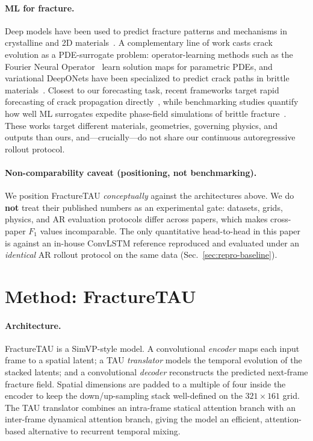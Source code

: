 \documentclass[11pt]{article}
\begin{document}
\paragraph{ML for fracture.}
Deep models have been used to predict fracture patterns and mechanisms in
crystalline and 2D materials~\citep{hsu2020fracture,lew2021fracture}. A
complementary line of work casts crack evolution as a PDE-surrogate problem:
operator-learning methods such as the Fourier Neural Operator~\citep{li2021fno}
learn solution maps for parametric PDEs, and variational DeepONets have been
specialized to predict crack paths in brittle materials~\citep{goswami2022deeponet}.
Closest to our forecasting task, recent frameworks target rapid forecasting of
crack propagation directly~\citep{yan2024crackforecast}, while benchmarking studies
quantify how well ML surrogates expedite phase-field simulations of brittle
fracture~\citep{hamdi2025phasefield}. These works target different materials,
geometries, governing physics, and outputs than ours, and---crucially---do not
share our continuous autoregressive rollout protocol.

\paragraph{Non-comparability caveat (positioning, not benchmarking).}
We position FractureTAU \emph{conceptually} against the architectures above. We do
\textbf{not} treat their published numbers as an experimental gate: datasets,
grids, physics, and AR evaluation protocols differ across papers, which makes
cross-paper $F_1$ values incomparable. The only quantitative head-to-head in this
paper is against an in-house ConvLSTM reference reproduced and evaluated under an
\emph{identical} AR rollout protocol on the same data
(Sec.~\ref{sec:repro-baseline}).

\section{Method: FractureTAU}
\label{sec:method}

\paragraph{Architecture.}
FractureTAU is a SimVP-style model. A convolutional \emph{encoder} maps each input
frame to a spatial latent; a TAU \emph{translator} models the temporal evolution
of the stacked latents; and a convolutional \emph{decoder} reconstructs the
predicted next-frame fracture field. Spatial dimensions are padded to a multiple
of four inside the encoder to keep the down/up-sampling stack well-defined on the
$321\times161$ grid. The TAU translator combines an intra-frame statical attention
branch with an inter-frame dynamical attention branch, giving the model an
efficient, attention-based alternative to recurrent temporal mixing.
\end{document}
